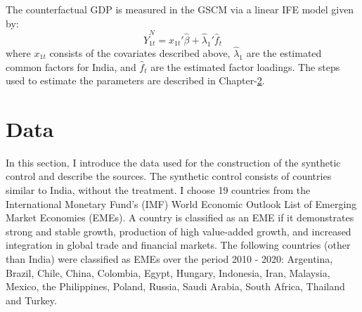 \documentclass[12pt,nobind, a4paper]{reedthesis}
\begin{document}
 The counterfactual GDP is measured in the GSCM via a linear IFE model given by:
 \begin{equation}
 \hat{Y}_{1t}^{N}=x_{1t}'\hat{\beta}+\hat{\lambda}_{1}'\hat{f}_{t}
 \label{eq:eq009}
 \end{equation}
 where \(x_{1t}\) consists of the covariates described above, \(\hat{\lambda}_{1}\) are the estimated common factors for India, and \(\hat{f}_{t}\) are the estimated factor loadings. The steps used to estimate the parameters are described in Chapter-\protect\hyperlink{ch2}{2}.

 \hypertarget{dat}{%
 \section{Data}\label{dat}}

 In this section, I introduce the data used for the construction of the synthetic control and describe the sources. The synthetic control consists of countries similar to India, without the treatment. I choose 19 countries from the International Monetary Fund's (IMF) World Economic Outlook List of Emerging Market Economies (EMEs). A country is classified as an EME if it demonstrates strong and stable growth, production of high value-added growth, and increased integration in global trade and financial markets. The following countries (other than India) were classified as EMEs over the period 2010 - 2020: Argentina, Brazil, Chile, China, Colombia, Egypt, Hungary, Indonesia, Iran, Malaysia, Mexico, the Philippines, Poland, Russia, Saudi Arabia, South Africa, Thailand and Turkey.
 \linebreak
\end{document}
